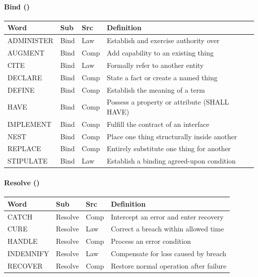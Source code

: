 \documentclass{article}
\begin{document}
\paragraph{Bind (\VocabVerbsBind)}
\small
\begin{tabular}{lllp{7cm}}
\toprule \textbf{Word} & \textbf{Sub} & \textbf{Src} & \textbf{Definition} \\ \midrule
ADMINISTER & Bind & Law & Establish and exercise authority over \\
AUGMENT & Bind & Comp & Add capability to an existing thing \\
CITE & Bind & Law & Formally refer to another entity \\
DECLARE & Bind & Comp & State a fact or create a named thing \\
DEFINE & Bind & Comp & Establish the meaning of a term \\
HAVE & Bind & Comp & Possess a property or attribute (SHALL HAVE) \\
IMPLEMENT & Bind & Comp & Fulfill the contract of an interface \\
NEST & Bind & Comp & Place one thing structurally inside another \\
REPLACE & Bind & Comp & Entirely substitute one thing for another \\
STIPULATE & Bind & Law & Establish a binding agreed-upon condition \\
\bottomrule
\end{tabular}
\normalsize

\paragraph{Resolve (\VocabVerbsResolve)}
\small
\begin{tabular}{lllp{7cm}}
\toprule \textbf{Word} & \textbf{Sub} & \textbf{Src} & \textbf{Definition} \\ \midrule
CATCH & Resolve & Comp & Intercept an error and enter recovery \\
CURE & Resolve & Law & Correct a breach within allowed time \\
HANDLE & Resolve & Comp & Process an error condition \\
INDEMNIFY & Resolve & Law & Compensate for loss caused by breach \\
RECOVER & Resolve & Comp & Restore normal operation after failure \\
\bottomrule
\end{tabular}
\normalsize
\end{document}
